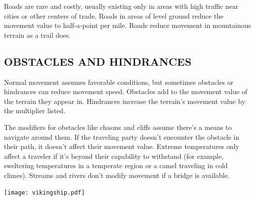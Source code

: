 \begin{multicols}{2}
Roads are rare and costly, usually existing only in areas with high traffic near cities or other centers of trade.  Roads in areas of level ground reduce the movement value to half-a-point per mile.  Roads reduce movement in mountainous terrain as a trail does.

\subsection{OBSTACLES AND HINDRANCES}

Normal movement assumes favorable conditions, but sometimes obstacles or hindrances can reduce movement speed.  Obstacles add to the movement value of the terrain they appear in.  Hindrances increase the terrain's movement value by the multiplier listed.

The modifiers for obstacles like chasms and cliffs assume there's a means to navigate around them.  If the traveling party doesn't encounter the obstacle in their path, it doesn't affect their movement value.  Extreme temperatures only affect a traveler if it's beyond their capability to withstand (for example, sweltering temperatures in a temperate region or a camel traveling in cold climes).  Streams and rivers don't modify movement if a bridge is available.

\noindent\texttt{[image: vikingship.pdf]}\label{vikingship}


\noindent
\begin{minipage}{\columnwidth}


\end{minipage}
\end{multicols}
